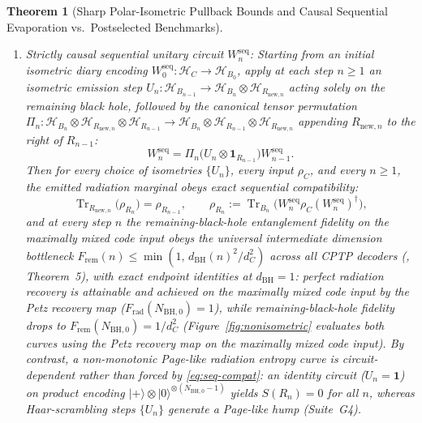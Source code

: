 \documentclass[11pt,a4paper]{article}
\newtheorem{theorem}{Theorem}
\theoremstyle{definition}
\theoremstyle{remark}
\newcommand{\Tr}{\operatorname{Tr}}
\newcommand{\cH}{\mathcal{H}}
\newcommand{\1}{\mathbf{1}}
\begin{document}
\begin{theorem}[Sharp Polar-Isometric Pullback Bounds and Causal Sequential Evaporation vs.\ Postselected Benchmarks]
\begin{enumerate}
  \begin{enumerate}
    \item[(c.1)] \emph{Strictly causal sequential unitary circuit $W_n^{\mathrm{seq}}$:} Starting from an initial isometric diary encoding $W_0^{\mathrm{seq}}:\cH_C\to\cH_{B_0}$, apply at each step $n\ge 1$ an isometric emission step $U_n:\cH_{B_{n-1}}\to\cH_{B_n}\otimes\cH_{R_{\mathrm{new},n}}$ acting solely on the remaining black hole, followed by the canonical tensor permutation $\Pi_n:\cH_{B_n}\otimes\cH_{R_{\mathrm{new},n}}\otimes\cH_{R_{n-1}}\to\cH_{B_n}\otimes\cH_{R_{n-1}}\otimes\cH_{R_{\mathrm{new},n}}$ appending $R_{\mathrm{new},n}$ to the right of $R_{n-1}$:
    \begin{equation}\label{eq:seq-circuit}
      W_n^{\mathrm{seq}} = \Pi_n\bigl(U_n \otimes \1_{R_{n-1}}\bigr) W_{n-1}^{\mathrm{seq}}.
    \end{equation}
    Then for \emph{every} choice of isometries $\{U_n\}$, \emph{every} input $\rho_C$, and every $n\ge 1$, the emitted radiation marginal obeys exact sequential compatibility:
    \begin{equation}\label{eq:seq-compat}
      \Tr_{R_{\mathrm{new},n}}\!\bigl(\rho_{R_n}\bigr) = \rho_{R_{n-1}},
      \qquad
      \rho_{R_n} := \Tr_{B_n}\!\bigl(W_n^{\mathrm{seq}}\rho_C (W_n^{\mathrm{seq}})^\dagger\bigr),
    \end{equation}
    and at every step $n$ the remaining-black-hole entanglement fidelity on the maximally mixed code input obeys the universal intermediate dimension bottleneck $F_{\mathrm{rem}}(n)\le\min(1,\,d_{\mathrm{BH}}(n)^2/d_C^2)$ across all CPTP decoders (\cite{Soga2026OSTQD}, Theorem~5), with exact endpoint identities at $d_{\mathrm{BH}}=1$: perfect radiation recovery is attainable and achieved on the maximally mixed code input by the Petz recovery map ($F_{\mathrm{rad}}(N_{\mathrm{BH},0})=1$), while remaining-black-hole fidelity drops to $F_{\mathrm{rem}}(N_{\mathrm{BH},0})=1/d_C^2$ (Figure~\ref{fig:nonisometric} evaluates both curves using the Petz recovery map on the maximally mixed code input). By contrast, a non-monotonic Page-like radiation entropy curve is \emph{circuit-dependent} rather than forced by \eqref{eq:seq-compat}: an identity circuit ($U_n=\1$) on product encoding $|+\rangle\otimes|0\rangle^{\otimes(N_{\mathrm{BH},0}-1)}$ yields $S(R_n)=0$ for all $n$, whereas Haar-scrambling steps $\{U_n\}$ generate a Page-like hump (Suite~G4).

\end{enumerate}
\end{enumerate}
\end{theorem}
\end{document}
